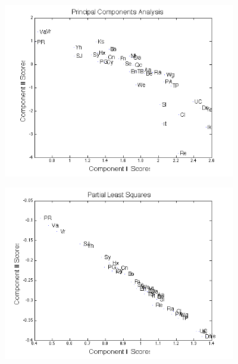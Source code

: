 \documentclass[11pt]{beamer}
\begin{document}
\begin{frame}

\begin{center}
\includegraphics[width=4in]{figs/Daily_PCA_Scores.png}
\end{center}

\end{frame}


\begin{frame}

\begin{center}
\includegraphics[width=4in]{figs/Daily_PLS_Scores.png}
\end{center}

\end{frame}

\end{document}
